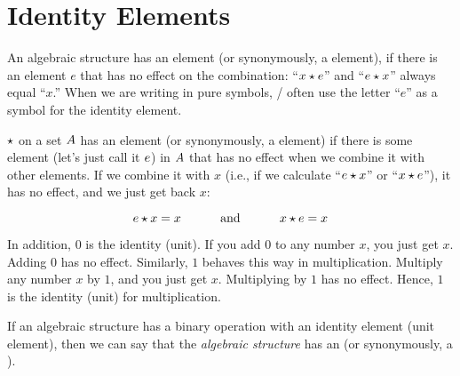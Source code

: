 \documentclass[../../../main.tex]{subfiles}
\begin{document}
\section{Identity Elements}

\begin{terminology}
  An algebraic structure has an  element (or synonymously, a  element), if there is an element $e$ that has no effect on the combination: ``$\op{x}{e}$'' and ``$\op{e}{x}$'' always equal ``$x$.'' When we are writing in pure symbols, \mathers/ often use the letter ``$e$'' as a symbol for the identity element.
\end{terminology}

 $\opSymbol/$ on a set $A$ has an  element (or synonymously, a  element) if there is some element (let's just call it $\unitEl/$) in $A$ that has no effect when we combine it with other elements. If we combine it with $x$ (i.e., if we calculate ``$\op{\unitEl/}{x}$'' or ``$\op{x}{\unitEl/}$''), it has no effect, and we just get back $x$:

\begin{equation*}
  \op{\unitEl/}{x} = x \hskip 1cm \text{ and } \hskip 1cm \op{x}{\unitEl/} = x
\end{equation*}

\begin{aside}
  \begin{remark}
    In addition, $0$ is the identity (unit). If you add $0$ to any number $x$, you just get $x$. Adding $0$ has no effect. Similarly, $1$ behaves this way in multiplication. Multiply any number $x$ by $1$, and you just get $x$. Multiplying by $1$ has no effect. Hence, $1$ is the identity (unit) for multiplication.
  \end{remark}
\end{aside}

If an algebraic structure has a binary operation with an identity element (unit element), then we can say that the \emph{algebraic structure} has an  (or synonymously, a ).
\end{document}
